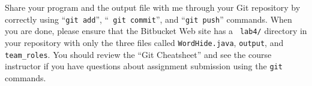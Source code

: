 \vspace{-0.1in}

Share your program and the output file with me through your Git repository by correctly using ``{\tt git add}'', ``{\tt
git commit}'', and ``{\tt git push}'' commands. When you are done, please ensure that the Bitbucket Web site has a {\tt
lab4/} directory in your repository with only the three files called {\tt WordHide.java}, {\tt output}, and {\tt
team\_roles}. You should review the ``Git Cheatsheet'' and see the course instructor if you have questions about assignment
submission using the {\tt git} commands.


